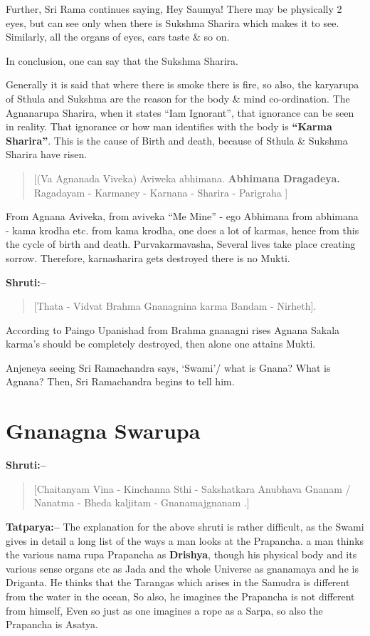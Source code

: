 Further, Sri Rama continues saying, Hey Saumya! There may be physically 2 eyes, but can see only when there is Sukshma Sharira which makes it to see. Similarly, all the organs of eyes, ears taste \& so on.

In conclusion, one can say that the Sukshma Sharira.

Generally it is said that where there is smoke there is fire, so also, the karyarupa of Sthula and Sukshma are the reason for the body \& mind co-ordination. The Agnanarupa Sharira, when it states “Iam Ignorant”, that ignorance can be seen in reality. That ignorance or how man identifies with the body is \textbf{“Karma Sharira”}. This is the cause of Birth and death, because of Sthula \& Sukshma Sharira have risen.

\begin{verse}
[(Va Agnanada Viveka) Aviweka abhimana. \textbf{Abhimana Dragadeya.} Ragadayam - Karmaney - Karnana - Sharira - Parigraha ]
\end{verse}

From Agnana Aviveka, from aviveka “Me Mine” - ego Abhimana from abhimana - kama krodha etc. from kama krodha, one does a lot of karmas, hence from this the cycle of birth and death. Purvakarmavasha, Several lives take place creating sorrow. Therefore, karnasharira gets destroyed there is no Mukti.

\textbf{Shruti:–}

\begin{verse}
[Thata - Vidvat Brahma Gnanagnina karma Bandam - Nirheth].
\end{verse}

According to Paingo Upanishad from Brahma gnanagni rises Agnana Sakala karma's should be completely destroyed, then alone one attains Mukti.

Anjeneya seeing Sri Ramachandra says, ‘Swami’/ what is Gnana? What is Agnana? Then, Sri Ramachandra begins to tell him.

\chapter{Gnanagna Swarupa}

\textbf{Shruti:–}

\begin{verse}
[Chaitanyam Vina - Kinchanna Sthi - Sakshatkara Anubhava Gnanam / Nanatma - Bheda kaljitam - Gnanamajgnanam .]
\end{verse}

\textbf{Tatparya:–} The explanation for the above shruti is rather difficult, as the Swami gives in detail a long list of the ways a man looks at the Prapancha. a man thinks the various nama rupa Prapancha as \textbf{Drishya}, though his physical body and its various sense organs etc as Jada and the whole Universe as gnanamaya and he is Driganta. He thinks that the Tarangas which arises in the Samudra is different from the water in the ocean, So also, he imagines the Prapancha is not different from himself, Even so just as one imagines a rope as a Sarpa, so also the Prapancha is Asatya.

